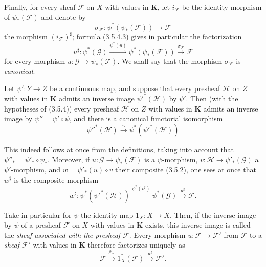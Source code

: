 \begin{env}[3.5.4]
Finally, for every sheaf $\mathcal{F}$ on $X$ with values in
$\boldsymbol{K}$, let $i_{\mathcal{F}}$ be the identity morphism of
$\psi_*(\mathcal{F})$ and denote by
\[
  \sigma_{\mathcal{F}}:
  \psi^*(\psi_*(\mathcal{F}))\to\mathcal{F}
\]
the morphism $(i_{\mathcal{F}})^\sharp$; formula (3.5.4.3) gives in
particular the factorization
\begin{equation*}
  u^\sharp:\psi^*(\mathcal{G})
  \xrightarrow{\psi^*(u)}
  \psi^*(\psi_*(\mathcal{F}))
  \xrightarrow{\sigma_{\mathcal{F}}}\mathcal{F}
\tag{3.5.4.4}\label{0.3.5.4.4}
\end{equation*}
for every morphism $u:\mathcal{G}\to\psi_*(\mathcal{F})$. We shall say that the
morphism $\sigma_{\mathcal{F}}$ is \emph{canonical}.
\end{env}

\begin{env}[3.5.5]
\label{0.3.5.5}
Let $\psi':Y\to Z$ be a continuous map, and suppose that every
presheaf $\mathcal{H}$ on $Z$ with values in $\boldsymbol{K}$ admits an
inverse image $\psi'^*(\mathcal{H})$ by $\psi'$. Then (with the
hypotheses of (3.5.4)) every presheaf $\mathcal{H}$ on $Z$ with values in
$\boldsymbol{K}$ admits an inverse image by $\psi''=\psi'\circ\psi$, and there is
a canonical functorial isomorphism
\begin{equation*}
  \psi''^*(\mathcal{H})\xrightarrow{\sim}
  \psi^*(\psi'^*(\mathcal{H}))
\tag{3.5.5.1}\label{0.3.5.5.1}
\end{equation*}


This indeed follows at once from the definitions, taking into account that
$\psi''_*=\psi'_*\circ\psi_*$. Moreover, if
$u:\mathcal{G}\to\psi_*(\mathcal{F})$ is a $\psi$-morphism,
$v:\mathcal{H}\to\psi'_*(\mathcal{G})$ a $\psi'$-morphism, and
$w=\psi'_*(u)\circ v$ their composite (3.5.2), one sees at once that
$w^\sharp$ is the composite morphism
\[
  w^\sharp:\psi^*(\psi'^*(\mathcal{H}))
  \xrightarrow{\psi^*(v^\sharp)}
  \psi^*(\mathcal{G})
  \xrightarrow{u^\sharp}\mathcal{F}.
\]
\end{env}

\begin{env}[3.5.6]
\label{0.3.5.6}
Take in particular for $\psi$ the identity map
$1_X:X\to X$. Then, if the inverse image by $\psi$ of a presheaf
$\mathcal{F}$ on $X$ with values in $\boldsymbol{K}$ exists, this
inverse image is called the \emph{sheaf associated with the presheaf $\mathcal{F}$}.
Every morphism $u:\mathcal{F}\to\mathcal{F}'$ from $\mathcal{F}$ to a
\emph{sheaf} $\mathcal{F}'$ with values in $\boldsymbol{K}$ therefore factorizes
uniquely as
\[
  \mathcal{F}\xrightarrow{\rho_{\mathcal{F}}}
  1_X^*(\mathcal{F})\xrightarrow{u^\sharp}\mathcal{F}'.
\]
\end{env}


